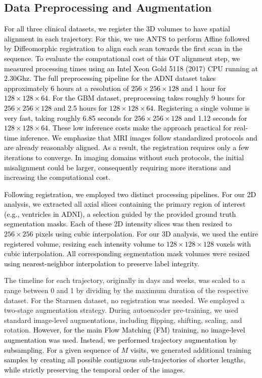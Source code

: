 \documentclass[twoside]{article}
\newcommand{\bc}[1]{\textcolor{black}{#1}}
\begin{document}
\subsection{Data Preprocessing and Augmentation}
\label{app:data-preprocessing-aug}
\textcolor{black}{For all three clinical datasets, we register the 3D volumes to have spatial alignment in each trajectory. For this, we use ANTS \citep{Avants2009} to perform Affine followed by Diffeomorphic registration to align each scan towards the first scan in the sequence. To evaluate the computational cost of this OT alignment step, we measured processing times using an Intel Xeon Gold 5118 (2017) CPU running at 2.30Ghz. The full preprocessing pipeline for the ADNI dataset takes approximately 6 hours at a resolution of $256 \times 256 \times 128$ and 1 hour for $128 \times 128 \times 64$. For the GBM dataset, preprocessing takes roughly 9 hours for $256 \times 256 \times 128$ and 2.5 hours for $128 \times 128 \times 64$. Registering a single volume is very fast, taking roughly 6.85 seconds for $256 \times 256 \times 128$ and 1.12 seconds for $128 \times 128 \times 64$. These low inference costs make the approach practical for real-time inference. We emphasize that MRI images follow standardized protocols and are already reasonably aligned. As a result, the registration requires only a few iterations to converge. In imaging domains without such protocols, the initial misalignment could be larger, consequently requiring more iterations and increasing the computational cost.}

\bc{Following registration, we employed two distinct processing pipelines. For our 2D analysis, we extracted all axial slices containing the primary region of interest (e.g., ventricles in ADNI), a selection guided by the provided ground truth segmentation masks. Each of these 2D intensity slices was then resized to \(256 \times 256\) pixels using cubic interpolation. For our 3D analysis, we used the entire registered volume, resizing each intensity volume to \(128 \times 128 \times 128\) voxels with cubic interpolation. All corresponding segmentation mask volumes were resized using nearest-neighbor interpolation to preserve label integrity.}

The timeline for each trajectory, originally in days and weeks, was scaled to a range between 0 and 1 by dividing by the maximum duration of the respective dataset. For the Starmen dataset, no registration was needed. We employed a two-stage augmentation strategy. During autoencoder pre-training, we used standard image-level augmentations, including flipping, shifting, scaling, and rotation. \bc{However, for the main Flow Matching (FM) training, no image-level augmentation was used. Instead, we performed trajectory augmentation by subsampling. For a given sequence of \(M\) visits, we generated additional training samples by creating all possible contiguous sub-trajectories of shorter lengths, while strictly preserving the temporal order of the images.} 
\end{document}
